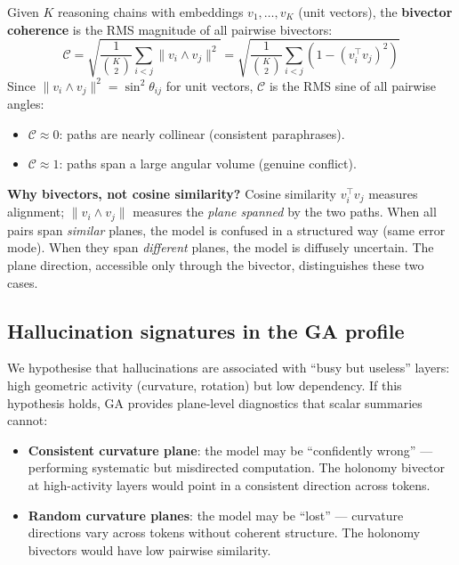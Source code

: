 \documentclass[11pt, twoside, openright]{memoir}
\newcommand{\op}{\wedge}          %
\numberwithin{equation}{chapter}
\begin{document}
Given $K$ reasoning chains with embeddings $v_1, \ldots, v_K$ (unit
vectors), the \textbf{bivector coherence} is the RMS magnitude of
all pairwise bivectors:
\begin{equation}
  \mathcal{C} = \sqrt{\frac{1}{\binom{K}{2}}
  \sum_{i < j} \|v_i \op v_j\|^2}
  = \sqrt{\frac{1}{\binom{K}{2}}
  \sum_{i < j} (1 - (v_i^\top v_j)^2)}
\end{equation}
Since $\|v_i \op v_j\|^2 = \sin^2\theta_{ij}$ for unit vectors,
$\mathcal{C}$ is the RMS sine of all pairwise angles:
\begin{itemize}[nosep]
\item $\mathcal{C} \approx 0$: paths are nearly collinear
  (consistent paraphrases).
\item $\mathcal{C} \approx 1$: paths span a large angular volume
  (genuine conflict).
\end{itemize}

\begin{gabox}
\textbf{Why bivectors, not cosine similarity?}  Cosine similarity
$v_i^\top v_j$ measures alignment; $\|v_i \op v_j\|$ measures the
\emph{plane spanned} by the two paths.  When all pairs span
\emph{similar} planes, the model is confused in a structured way
(same error mode).  When they span \emph{different} planes, the model
is diffusely uncertain.  The plane direction, accessible only through
the bivector, distinguishes these two cases.
\end{gabox}

\subsection{Hallucination signatures in the GA profile}

We hypothesise that hallucinations are associated with ``busy but
useless'' layers: high geometric activity (curvature, rotation) but low
dependency.  If this hypothesis holds, GA provides plane-level
diagnostics that scalar summaries cannot:

\begin{itemize}[nosep]
\item \textbf{Consistent curvature plane}: the model may be
  ``confidently wrong'' --- performing systematic but misdirected
  computation.  The holonomy bivector at high-activity layers would
  point in a consistent direction across tokens.
\item \textbf{Random curvature planes}: the model may be ``lost'' ---
  curvature directions vary across tokens without coherent structure.
  The holonomy bivectors would have low pairwise similarity.
\end{itemize}
\end{document}
